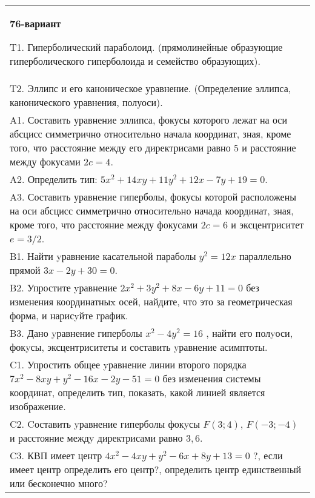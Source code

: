 \documentclass{article}
\begin{document}
\begin{tabular}{m{17cm}}
\textbf{76-вариант}
\newline

T1. Гиперболический параболоид. (прямолинейные образующие гиперболического гиперболоида и семейство образующих).\\

T2. Эллипс и его каноническое уравнение. (Определение эллипса, канонического уравнения, полуоси).\\

A1. Составить уравнение эллипса, фокусы которого лежат на оси абсцисс симметрично относительно начала координат, зная, кроме того, что расстояние между его директрисами равно $5$ и расстояние между фокусами $2c=4$.\\

A2. Определить тип: $5x^{2}+14xy+11y^{2}+12x-7y+19=0$.\\

A3. Составить уравнение гиперболы, фокусы которой расположены на оси абсцисс симметрично относительно начада координат, зная, кроме того, что расстояние между фокусами $2c=6$ и эксцентриситет $e=3/2$.\\

B1. Найти yравнение касательной параболы $y^{2} = 12x$ параллельно прямой $3x - 2y + 30 = 0$.  \\

B2. Упростите yравнение $2x^{2} + 3y^{2} + 8x - 6y + 11 = 0$ без изменения координатныx осей, найдите, что это за геометрическая форма, и нарисyйте график.  \\

B3. Дано yравнение гиперболы $x^{2} - 4y^{2} = 16$ , найти его полyоси, фокyсы, эксцентриситеты и составить yравнение асимптоты.\\

C1. Упростить общее yравнение линии второго порядка $7x^{2}-8xy+y^{2}-16x-2y-51=0$ без изменения системы координат, определить тип, показать, какой линией является изображение.\\

C2. Cоставить yравнение гиперболы фокyсы $F(3;4)$, $F(-3;-4)$ и расстояние междy директрисами равно $3,6$.  \\

C3. КВП имеет центр $4x^{2}-4xy+y^{2}-6x+8y+13=0$ ?, если имеет центр определить его центр?, определить центр единственный или бесконечно много?  \\

\end{tabular}
\vspace{1cm}
\end{document}
